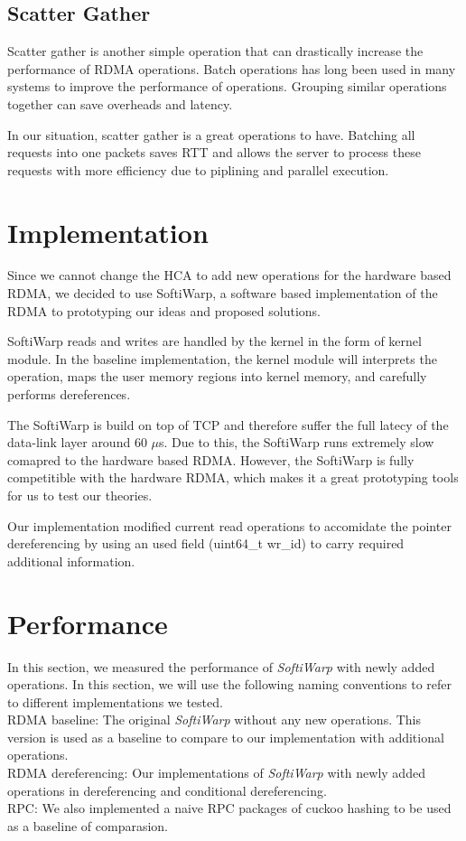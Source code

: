 \documentclass[a4paper, oneside, 10pt]{article}
\begin{document}

\subsection{Scatter Gather}

Scatter gather is another simple operation that can drastically increase the
performance of RDMA operations. Batch operations has long been used in many
systems to improve the performance of operations. Grouping similar operations
together can save overheads and latency.

In our situation, scatter gather is a great operations to have. Batching all
requests into one packets saves RTT and allows the server to process these
requests with more efficiency due to piplining and parallel execution.

\section{Implementation}


Since we cannot change the HCA to add new operations for the hardware based
RDMA, we decided to use SoftiWarp, a software based implementation of the RDMA
to prototyping our ideas and proposed solutions.

SoftiWarp reads and writes are handled by the kernel in the form of kernel
module. In the baseline implementation, the kernel module will interprets the
operation, maps the user memory regions into kernel memory, and carefully
performs dereferences.

The SoftiWarp is build on top of TCP and therefore suffer the full latecy of the
data-link layer around 60 $\mu$s. Due to this, the SoftiWarp runs extremely slow
comapred to the hardware based RDMA. However, the SoftiWarp is fully
competitible with the hardware RDMA, which makes it a great prototyping tools
for us to test our theories.

Our implementation modified current read operations to accomidate the pointer
dereferencing by using an used field (uint64\_t wr\_id) to carry required
additional information.

\section{Performance}
In this section, we measured the performance of \emph{SoftiWarp} with newly
added operations. In this section, we will use the following naming conventions
to refer to different implementations we tested.\\
RDMA baseline: The original \emph{SoftiWarp} without any new operations. This
version is used as a baseline to compare to our implementation with additional
operations.\\
RDMA dereferencing: Our implementations of \emph{SoftiWarp} with newly added
operations in dereferencing and conditional dereferencing.\\
RPC: We also implemented a naive RPC packages of cuckoo hashing to be used as a
baseline of comparasion.\\
\end{document}
